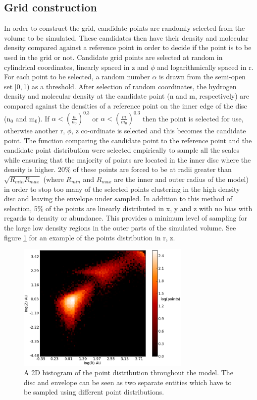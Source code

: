 \documentclass[useAMS,usenatbib]{mn2e}
\begin{document}
\subsection{Grid construction} \label{subsec:gridding}
In order to construct the grid, candidate points are randomly selected from the volume to be simulated. These candidates then have their density and molecular density compared against a reference point in order to decide if the point is to be used in the grid or not. Candidate grid points are selected at random in cylindrical coordinates, linearly spaced in z and $\phi$ and logarithmically spaced in r. For each point to be selected, a random number $\alpha$ is drawn from the semi-open set [0,$\,$1) as a threshold. After selection of random coordinates, the hydrogen density and molecular density at the candidate point (n and m, respectively) are compared against the densities of a reference point on the inner edge of the disc (n$_0$ and m$_0$). If $\alpha<\left( \frac{n}{n_0} \right)^{0.3}$ or $\alpha< \left( \frac{m}{m_0} \right)^{0.3}$ then the point is selected for use, otherwise another r, $\phi$, z co-ordinate is selected and this becomes the candidate point. The function comparing the candidate point to the reference point and the candidate point distribution were selected empirically to sample all the scales while ensuring that the majority of points are located in the inner disc where the density is higher. 20\% of these points are forced to be at radii greater than $\sqrt{R_{min}R_{max}}$ (where $R_{min}$ and $R_{max}$ are the inner and outer radius of the model) in order to stop too many of the selected points clustering in the high density disc and leaving the envelope under sampled. In addition to this method of selection, 5\% of the points are linearly distributed in x, y and z with no bias with regards to density or abundance. This provides a minimum level of sampling for the large low density regions in the outer parts of the simulated volume. See figure \ref{points} for an example of the points distribution in r, z. \smallskip

\begin{figure}
 \includegraphics[width=84mm]{Figures/model/lime_points_rz_histo2.eps}
 \caption{A 2D histogram of the point distribution throughout the model. The disc and envelope can be seen as two separate entities which have to be sampled using different point distributions.}
 \label{points}
\end{figure}
\end{document}
